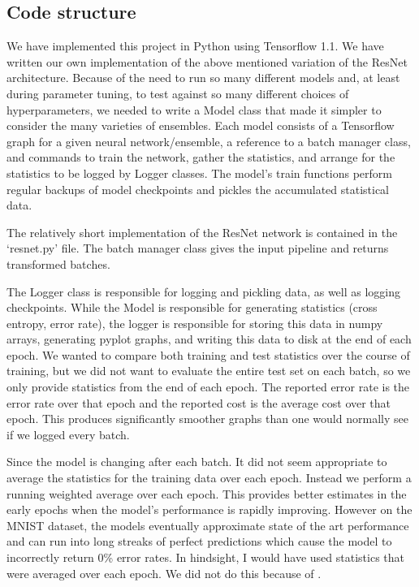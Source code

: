\documentclass[english,a4paper,oneside]{amsart}
\theoremstyle{definition}
\begin{document}
\subsection{Code structure}
We have implemented this project in Python using Tensorflow 1.1. We have written our own implementation of the above mentioned variation of the ResNet architecture. Because of the need to run so many different models and, at least during parameter tuning, to test against so many different choices of hyperparameters, we needed to write a Model class that made it simpler to consider the many varieties of ensembles. Each model consists of a Tensorflow graph for a given neural network/ensemble, a reference to a batch manager class, and commands to train the network, gather the statistics, and arrange for the statistics to be logged by Logger classes. The model's train functions perform regular backups of model checkpoints and pickles the accumulated statistical data.

The relatively short implementation of the ResNet network is contained in the `resnet.py' file. The batch manager class gives the input pipeline and returns transformed batches. 

The Logger class is responsible for logging and pickling data, as well as logging checkpoints. While the Model is responsible for generating statistics (cross entropy, error rate), the logger is responsible for storing this data in numpy arrays, generating pyplot graphs, and writing this data to disk at the end of each epoch. We wanted to compare both training and test statistics over the course of training, but we did not want to evaluate the entire test set on each batch, so we only provide statistics from the end of each epoch. The reported error rate is the error rate over that epoch and the reported cost is the average cost over that epoch. This produces significantly smoother graphs than one would normally see if we logged every batch. 

\begin{remark}
Since the model is changing after each batch. It did not seem appropriate to average the statistics for the training data over each epoch. Instead we perform a running weighted average over each epoch. This provides better estimates in the early epochs when the model's performance is rapidly improving. However on the MNIST dataset, the models eventually approximate state of the art performance and can run into long streaks of perfect predictions which cause the model to incorrectly return 0\% error rates. In hindsight, I would have used statistics that were averaged over each epoch. We did not do this because of .
\end{remark}
\end{document}
